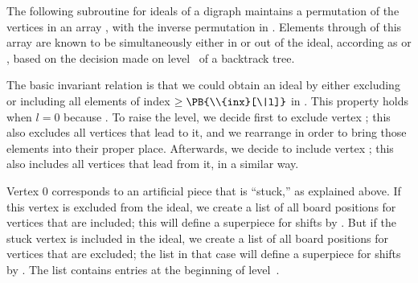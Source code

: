 The following subroutine for ideals of a digraph maintains a permutation
of the vertices in an array , with the inverse permutation in .
Elements  through  of this
array are known to be
simultaneously either in or out of the ideal, according as 
or , based on the decision
made on level~ of a backtrack tree.

The basic invariant relation is that we could obtain an ideal by either
excluding or including all elements of index $\ge\PB{\\{inx}[\|l]}$ in .
This property holds
when $l=0$ because . To raise the level, we decide
first to
exclude vertex ; this also excludes all vertices
that lead to it, and we rearrange  in order to bring those
elements into their proper place. Afterwards, we decide to include
vertex ; this also includes all vertices that lead
from it,
in a similar way.

Vertex 0 corresponds to an artificial piece that is ``stuck,'' as
explained above. If this vertex is excluded from the ideal, we create a list
of all board positions for vertices that are included; this
will define a superpiece for shifts by . But if the stuck vertex is
included in the ideal, we create a list of all board positions for vertices
that are excluded; the list in that case will define a superpiece for shifts
by . The list contains  entries at the
beginning of level~.

